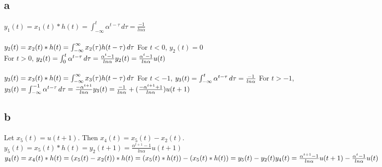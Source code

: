 \documentclass[12pt]{article}
\begin{document}
    \subsection*{a}
    \begin{math}
      y_1(t) = x_1(t)*h(t) = \int_{-\infty}^{t} \alpha^{t-\tau} \,d\tau = \frac{-1}{ln\alpha}  
    \end{math}\\ \\
    \begin{math}
      y_2(t) = x_2(t)*h(t) = \int_{-\infty}^{\infty} x_2(\tau)h(t-\tau) \,d\tau \\
    \end{math}
    For \(t < 0\), \(y_2(t) = 0\)\\
    For \(t > 0\),
    \begin{math}
      y_2(t) = \int_{0}^{t} \alpha^{t-\tau} \,d\tau = \frac{\alpha^t-1}{ln\alpha} \\
      y_2(t) = \frac{\alpha^t-1}{ln\alpha}u(t)
    \end{math} \\ \\
    \begin{math}
      y_3(t) = x_3(t)*h(t) = \int_{-\infty}^{\infty} x_3(\tau)h(t-\tau) \,d\tau \\
    \end{math}
    For \(t < -1\),
    \begin{math}
      y_3(t) = \int_{-\infty}^{t} \alpha^{t-\tau} \,d\tau = \frac{-1}{ln\alpha} \\
    \end{math}
    For \(t > -1\),
    \begin{math}
      y_3(t) = \int_{-\infty}^{-1} \alpha^{t-\tau} \,d\tau = \frac{-\alpha^{t+1}}{ln\alpha} \\
      y_3(t) = \frac{-1}{ln\alpha} + (\frac{-\alpha^{t+1} + 1}{ln\alpha})u(t+1)
    \end{math}
    \subsection*{b}
    Let \(x_5(t) = u(t+1)\). Then \(x_4(t) = x_5(t) - x_2(t)\).\\
    \(y_5(t) = x_5(t)*h(t) = y_2(t+1) = \frac{\alpha^{t+1}-1}{ln\alpha}u(t+1)\)\\
    \(y_4(t) = x_4(t)*h(t) = (x_5(t) - x_2(t))*h(t)\\
    = (x_5(t)*h(t)) - (x_5(t)*h(t))\\
    = y_5(t) - y_2(t) \\
    y_4(t) = \frac{\alpha^{t+1}-1}{ln\alpha}u(t+1) - \frac{\alpha^t-1}{ln\alpha}u(t)
    \)
\end{document}
